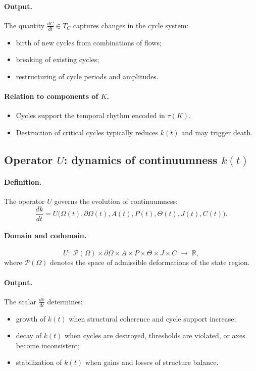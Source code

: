 \paragraph{Output.}
The quantity \(\frac{dC}{dt}\in T_C\) captures changes in the cycle system:
\begin{itemize}
  \item birth of new cycles from combinations of flows;
  \item breaking of existing cycles;
  \item restructuring of cycle periods and amplitudes.
\end{itemize}

\paragraph{Relation to components of \texorpdfstring{\(K\)}{K}.}
\begin{itemize}
  \item Cycles support the temporal rhythm encoded in \(\tau(K)\).
  \item Destruction of critical cycles typically reduces \(k(t)\) and may trigger death.
\end{itemize}

\subsection{Operator \texorpdfstring{\(U\)}{U}: dynamics of continuumness \(k(t)\)}

\paragraph{Definition.}
The operator \(U\) governs the evolution of continuumness:
\[
  \frac{dk}{dt} = U\bigl(\Omega(t),\partial\Omega(t),A(t),P(t),\Theta(t),J(t),C(t)\bigr).
\]

\paragraph{Domain and codomain.}
\[
  U:\; \mathcal{P}(\Omega)\times\partial\Omega\times A\times P\times\Theta\times J\times C
  \;\longrightarrow\; \mathbb{R},
\]
where \(\mathcal{P}(\Omega)\) denotes the space of admissible deformations of the state region.

\paragraph{Output.}
The scalar \(\frac{dk}{dt}\) determines:
\begin{itemize}
  \item growth of \(k(t)\) when structural coherence and cycle support increase;
  \item decay of \(k(t)\) when cycles are destroyed, thresholds are violated, or axes become inconsistent;
  \item stabilization of \(k(t)\) when gains and losses of structure balance.
\end{itemize}

